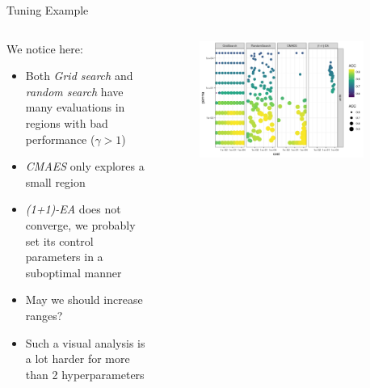 \documentclass[11pt,compress,t,notes=noshow, xcolor=table]{beamer}
\begin{document}
\begin{frame}{Tuning Example}

\begin{columns}
\begin{column}{0.55\textwidth}

  We notice here:

  \begin{itemize}
      \item Both \emph{Grid search} and \emph{random search} have many evaluations in regions with bad performance ($\gamma>1$)
      \item \emph{CMAES} only explores a small region
      \item \emph{(1+1)-EA} does not converge, we probably set its control parameters in a suboptimal manner
      \item May we should increase ranges?
      \item Such a visual analysis is a lot harder for more than 2 hyperparameters
  \end{itemize}
\end{column}%
\begin{column}{0.5\textwidth}
  \vspace{-1em}
  \begin{figure}
  \includegraphics[width=0.9\textwidth]{figure/benchmark_scatter.png}
  \end{figure}
\end{column}
\end{columns}

\end{frame}
\end{document}
